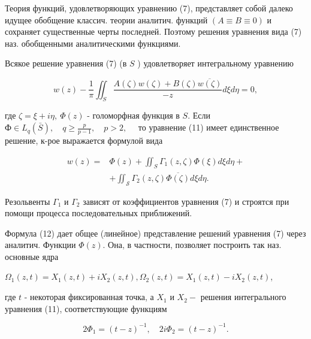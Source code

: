 \documentclass[10pt]{article}
\begin{document}
Теория функций, удовлетворяющих уравнению (7), представляет собой далеко идущее обобщение классич. теории аналитич. функций $(A \equiv B \equiv 0)$ и сохраняет существенные черты последней. Поэтому решения уравнения вида (7) наз. обобщенными аналитическими функциями.



Всякое решение уравнения (7) (в $S$ ) удовлетворяет интегральному уравнению



\[

w(z)-\frac{1}{\pi} \iint_{S} \frac{A(\zeta) w(\zeta)+B(\zeta) \overline{w(\zeta)}}{-z} d \xi d \eta=0,

\]



где $\zeta=\xi+i \eta, ~ \Phi(z)$ - голоморфная функция в $S$. Если $Ф \in L_{q}(\bar{S}), \quad q \geqslant \frac{p}{p-1}, \quad p>2, \quad$ то уравнение (11) имеет единственное решение, к-рое выражается формулой вида



\[

\begin{aligned}

w(z)= & \Phi(z)+\iint_{S} \Gamma_{1}(z, \zeta) \Phi(\xi) d \xi d \eta+ \\

& +\iint_{\mathcal{S}} \Gamma_{2}(z, \zeta) \overline{\Phi(\zeta)} d \xi d \eta .

\end{aligned}

\]



Резольвенты $\Gamma_{1}$ и $\Gamma_{2}$ зависят от коэффициентов уравнения (7) и строятся при помощи процесса последовательных приближений.



Формула (12) дает общее (линейное) представление решений уравнения (7) через аналитич. Функции $\Phi(z)$. Она, в частности, позволяет построить так наз. основные ядра



$\Omega_{1}(z, t)=X_{1}(z, t)+i X_{2}(z, t), \Omega_{2}(z, t)=X_{1}(z, t)-i X_{2}(z, t)$,



где $t$ - некоторая фиксированная точка, а $X_{1}$ и $X_{2}-$ решения интегрального уравнения (11), соответствующие функциям



\[

2 \Phi_{1}=(t-z)^{-1}, \quad 2 i \Phi_{2}=(t-z)^{-1} .

\]
\end{document}
